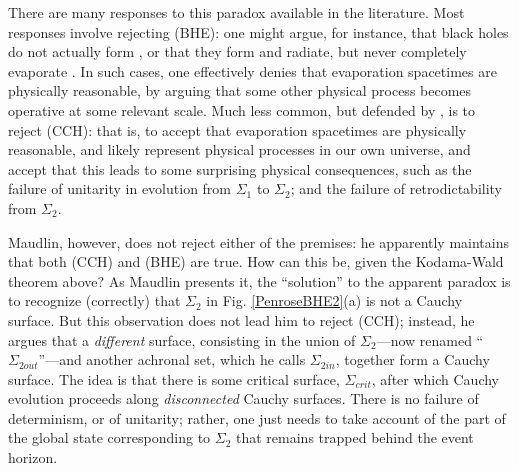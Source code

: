 \documentclass[authoryear,12pt,3p]{jowarticle}
\begin{document}
There are many responses to this paradox available in the literature.  Most responses involve rejecting (BHE): one might argue, for instance, that black holes do not actually form \citep{Fuzzball}, or that they form and radiate, but never completely evaporate \citep{EllisRemnant}.  In such cases, one effectively denies that evaporation spacetimes are physically reasonable, by arguing that some other physical process becomes operative at some relevant scale.  Much less common, but defended by \citet{Unruh+Wald}, is to reject (CCH): that is, to accept that evaporation spacetimes are physically reasonable, and likely represent physical processes in our own universe, and accept that this leads to some surprising physical consequences, such as the failure of unitarity in evolution from $\Sigma_1$ to $\Sigma_2$; and the failure of retrodictability from $\Sigma_2$.

Maudlin, however, does not reject either of the premises: he apparently maintains that both (CCH) and (BHE) are true.  How can this be, given the Kodama-Wald theorem above?  As Maudlin presents it, the ``solution'' to the apparent paradox is to recognize (correctly) that $\Sigma_2$ in Fig. \ref{PenroseBHE2}(a) is not a Cauchy surface.  But this observation does not lead him to reject (CCH); instead, he argues that a \emph{different} surface, consisting in the union of $\Sigma_2$---now renamed ``$\Sigma_{2out}$''---and another achronal set, which he calls $\Sigma_{2in}$, together form a Cauchy surface.  The idea is that there is some critical surface, $\Sigma_{crit}$, after which Cauchy evolution proceeds along \emph{disconnected} Cauchy surfaces.  There is no failure of determinism, or of unitarity; rather, one just needs to take account of the part of the global state corresponding to $\Sigma_2$ that remains trapped behind the event horizon.
\end{document}
